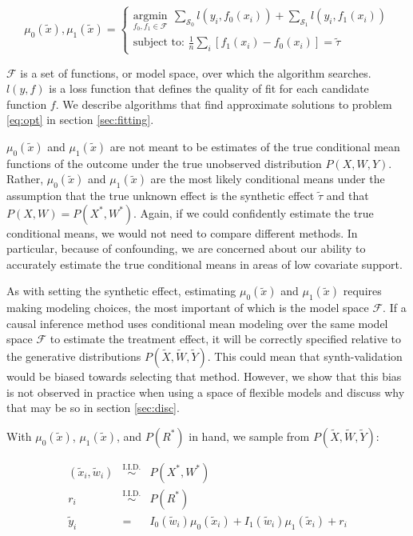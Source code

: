 \begin{equation}
\mu_0(\tilde x), \mu_1(\tilde x) = 
\begin{cases}
\underset{f_0, f_1 \in \mathcal{F}}{\text{argmin}} \ \  \sum_{\mathcal{S}_0}  l(y_i, f_0(x_i)) + \sum_{\mathcal{S}_1}  l(y_i, f_1(x_i)) \\
\text{subject to:   } \frac{1}{n}\sum_i[f_1(x_i) - f_0(x_i)] = \tilde \tau
\end{cases}
\label{eq:opt}
\end{equation}

$\mathcal{F}$ is a set of functions, or model space, over which the algorithm searches. $l(y,f)$ is a loss function that defines the quality of fit for each candidate function $f$. We describe algorithms that find approximate solutions to problem \ref{eq:opt} in section \ref{sec:fitting}.

$\mu_0(\tilde x)$ and $\mu_1(\tilde x)$ are not meant to be estimates of the true conditional mean functions of the outcome under the true unobserved distribution $P(X,W,Y)$. Rather, $\mu_0(\tilde x)$ and $\mu_1(\tilde x)$ are the most likely conditional means under the assumption that the true unknown effect is the synthetic effect $\tilde \tau$ and that $P(X,W) = P(X^*, W^*)$. Again, if we could confidently estimate the true conditional means, we would not need to compare different methods. In particular, because of confounding, we are concerned about our ability to accurately estimate the true conditional means in areas of low covariate support. 

As with setting the synthetic effect, estimating $\mu_0(\tilde x)$ and $\mu_1(\tilde x)$ requires making modeling choices, the most important of which is the model space $\mathcal{F}$. If a causal inference method uses conditional mean modeling over the same model space $\mathcal{F}$ to estimate the treatment effect, it will be correctly specified relative to the generative distributions $P(\tilde X, \tilde W, \tilde Y)$. This could mean that synth-validation would be biased towards selecting that method. However, we show that this bias is not observed in practice when using a space of flexible models and discuss why that may be so in section \ref{sec:disc}.

With $\mu_0(\tilde x)$, $\mu_1(\tilde x)$, and $P(R^*)$ in hand, we sample from $P(\tilde X, \tilde W, \tilde Y)$:

\begin{equation}
\begin{array}{rcl}
(\tilde x_i, \tilde w_i) & \overset{\text{I.I.D.}}{\sim} & P(X^*, W^*) \\
r_i & \overset{\text{I.I.D.}}{\sim} & P(R^*) \\
\tilde y_i & = & I_0(\tilde w_i)\mu_0(\tilde x_i) + I_1(\tilde w_i)\mu_1(\tilde x_i)+ r_i
\end{array}
\end{equation}

